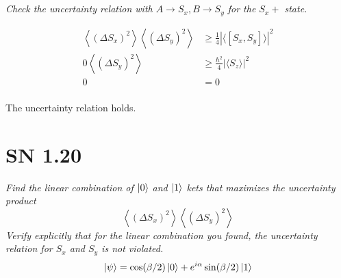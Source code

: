 \documentclass{article}
\begin{document}
\subsection{}
\textit{Check the uncertainty relation with $A \rightarrow S_{x}, B \rightarrow S_{y}$ for the $S_{x}+$ state.}

\begin{align*}
\left\langle(\Delta  S_{x})^{2}\right\rangle\left\langle(\Delta  S_{y})^{2}\right\rangle &\geq \frac{1}{4}|\langle[ S_{x},  S_{y}]\rangle|^{2}\\
0 \left\langle(\Delta  S_{y})^{2}\right\rangle &\geq \frac{\hbar^2}{4} |\langle S_{z}\rangle|^{2}\\
0 &= 0 \\
\end{align*}

The uncertainty relation holds. 



\newpage
\section{SN 1.20}
\textit{Find the linear combination of $\ket{0}$ and $\ket{1}$ kets that maximizes the uncertainty product
$$
\left\langle\left(\Delta S_{x}\right)^{2}\right\rangle\left\langle\left(\Delta S_{y}\right)^{2}\right\rangle
$$
Verify explicitly that for the linear combination you found, the uncertainty relation for $S_{x}$ and $S_{y}$ is not violated.}
$$\ket{\psi} =\cos (\beta / 2) \ket{0} + e^{i \alpha} \sin (\beta / 2) \ket{1}$$
\end{document}
